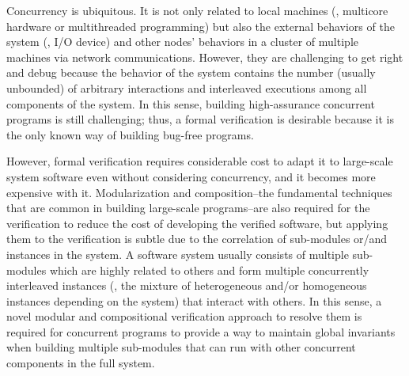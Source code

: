 Concurrency is ubiquitous. It is not only related to local machines 
 (\ie, multicore hardware or multithreaded programming)
but also the external behaviors of the system  (\ie, I/O device) and other nodes’ behaviors in a cluster of multiple machines via network communications.
However, they are challenging to get right and debug because the behavior of the system contains the number
(usually unbounded) of arbitrary interactions and interleaved executions among all components of the system. 
In this sense, building high-assurance concurrent programs is still challenging; thus, a formal verification is desirable 
because it is the only known way of building bug-free programs.

However, formal verification requires considerable cost to adapt it to large-scale system software even without considering concurrency, 
and it becomes more expensive with it. 
Modularization and composition--the fundamental techniques that are common in building large-scale programs--are also required for the verification
to reduce the cost of developing the verified software, but applying them to the verification is subtle due to the correlation of sub-modules 
or/and instances in the system. 
A software system usually consists of multiple sub-modules which are highly related to others and form multiple concurrently interleaved instances 
(\ie, the mixture of heterogeneous and/or homogeneous instances depending on the system) that interact with others. In this sense, a novel modular 
and compositional verification approach to resolve them is required for concurrent programs to provide a way to maintain global invariants 
when building multiple sub-modules that can run with other concurrent components in the full system.


